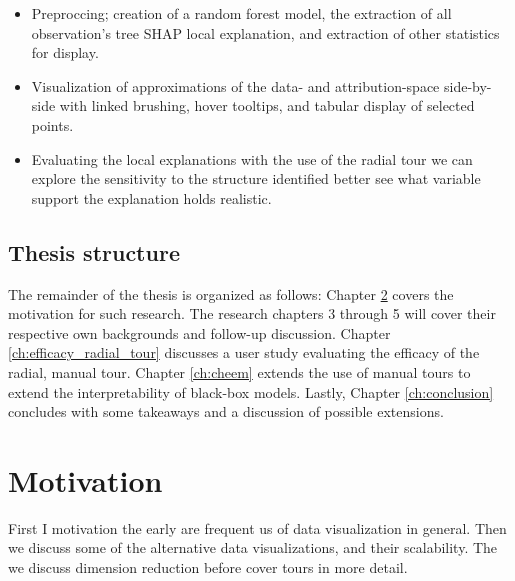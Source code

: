 \documentclass{template/monashthesis}
\begin{document}
\begin{enumerate}
  \begin{itemize}
  \tightlist
  \item
    Preproccing; creation of a random forest model, the extraction of all observation's tree SHAP local explanation, and extraction of other statistics for display.
  \item
    Visualization of approximations of the data- and attribution-space side-by-side with linked brushing, hover tooltips, and tabular display of selected points.
  \item
    Evaluating the local explanations with the use of the radial tour we can explore the sensitivity to the structure identified better see what variable support the explanation holds realistic.
  \end{itemize}
\end{enumerate}

\hypertarget{thesis-structure}{%
\section{Thesis structure}\label{thesis-structure}}

The remainder of the thesis is organized as follows: Chapter \ref{ch:motivation} covers the motivation for such research. The research chapters 3 through 5 will cover their respective own backgrounds and follow-up discussion. Chapter \ref{ch:efficacy_radial_tour} discusses a user study evaluating the efficacy of the radial, manual tour. Chapter \ref{ch:cheem} extends the use of manual tours to extend the interpretability of black-box models. Lastly, Chapter \ref{ch:conclusion} concludes with some takeaways and a discussion of possible extensions.

\hypertarget{ch:motivation}{%
\chapter{Motivation}\label{ch:motivation}}

First I motivation the early are frequent us of data visualization in general. Then we discuss some of the alternative data visualizations, and their scalability. The we discuss dimension reduction before cover tours in more detail.
\end{document}
